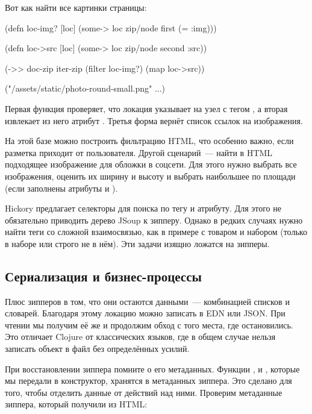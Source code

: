 Вот как найти все картинки страницы:

\begin{english}
  \begin{clojure}
(defn loc-img? [loc]
  (some-> loc zip/node first (= :img)))

(defn loc->src [loc]
  (some-> loc zip/node second :src))

(->> doc-zip
     iter-zip
     (filter loc-img?)
     (map loc->src))

("/assets/static/photo-round-small.png" ...)
  \end{clojure}
\end{english}

Первая функция проверяет, что локация указывает на узел с тегом , а
вторая извлекает из него атрибут . Третья форма вернёт список ссылок
на изображения.

На этой базе можно построить фильтрацию HTML, что особенно важно, если разметка
приходит от пользователя. Другой сценарий~--- найти в HTML подходящее изображение
для обложки в соцсети. Для этого нужно выбрать все изображения, оценить их
ширину и высоту и выбрать наибольшее по площади (если заполнены атрибуты 
и ).

Hickory предлагает селекторы для поиска по тегу и атрибуту. Для этого не
обязательно приводить дерево JSoup к зипперу. Однако в редких случаях нужно
найти теги со сложной взаимосвязью, как в примере с товаром и набором (только в
наборе или строго не в нём). Эти задачи изящно ложатся на зипперы.

\subsection{Сериализация и бизнес-процессы}


Плюс зипперов в том, что они остаются данными~--- комбинацией списков и
словарей. Благодаря этому локацию можно записать в EDN или JSON. При чтении мы
получим её же и продолжим обход с того места, где остановились. Это отличает
Clojure от классических языков, где в общем случае нельзя записать объект в файл
без определённых усилий.

При восстановлении зиппера помните о его метаданных. Функции ,
 и , которые мы передали в конструктор, хранятся в
метаданных зиппера. Это сделано для того, чтобы отделить данные от действий над
ними. Проверим метаданные зиппера, который получили из HTML:

